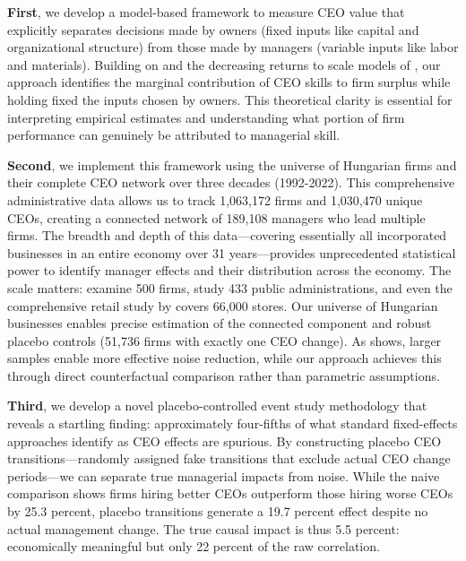 \documentclass[11pt,a4paper]{article}
\begin{document}
\textbf{First}, we develop a model-based framework to measure CEO value that explicitly separates decisions made by owners (fixed inputs like capital and organizational structure) from those made by managers (variable inputs like labor and materials). Building on \citet{Lucas1978-rp} and the decreasing returns to scale models of \citet{AtkesonKehoe2005JPE, McGrattan2012RED}, our approach identifies the marginal contribution of CEO skills to firm surplus while holding fixed the inputs chosen by owners. This theoretical clarity is essential for interpreting empirical estimates and understanding what portion of firm performance can genuinely be attributed to managerial skill.

\textbf{Second}, we implement this framework using the universe of Hungarian firms and their complete CEO network over three decades (1992-2022). This comprehensive administrative data allows us to track 1,063,172 firms and 1,030,470 unique CEOs, creating a connected network of 189,108 managers who lead multiple firms. The breadth and depth of this data---covering essentially all incorporated businesses in an entire economy over 31 years---provides unprecedented statistical power to identify manager effects and their distribution across the economy. The scale matters: \citet{fee2013managers} examine 500 firms, \citet{fenizia2022managers} study 433 public administrations, and even the comprehensive retail study by \citet{metcalfe2023managers} covers 66,000 stores. Our universe of Hungarian businesses enables precise estimation of the connected component and robust placebo controls (51,736 firms with exactly one CEO change). As \citet{morris1983parametric} shows, larger samples enable more effective noise reduction, while our approach achieves this through direct counterfactual comparison rather than parametric assumptions.

\textbf{Third}, we develop a novel placebo-controlled event study methodology that reveals a startling finding: approximately four-fifths of what standard fixed-effects approaches identify as CEO effects are spurious. By constructing placebo CEO transitions---randomly assigned fake transitions that exclude actual CEO change periods---we can separate true managerial impacts from noise. While the naive comparison shows firms hiring better CEOs outperform those hiring worse CEOs by 25.3 percent, placebo transitions generate a 19.7 percent effect despite no actual management change. The true causal impact is thus 5.5 percent: economically meaningful but only 22 percent of the raw correlation.
\end{document}

